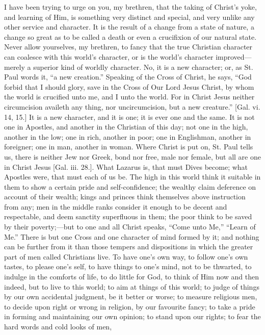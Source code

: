 I have been trying to urge on you, my brethren, that the taking of
Christ's yoke, and learning of Him, is something very distinct and
special, and very unlike any other service and character. It is the
result of a change from a state of nature, a change so great as to be
called a death or even a crucifixion of our natural state. Never allow
yourselves, my brethren, to fancy that the true Christian character
can coalesce with this world's character, or is the world's character
improved—merely a superior kind of worldly character. No, it is a
new character; or, as St. Paul words it, ``a new creation.''
Speaking of the Cross of Christ, he says, ``God forbid that I
should glory, save in the Cross of Our Lord Jesus Christ, by whom the
world is crucified unto me, and I unto the world. For in Christ Jesus
neither circumcision availeth any thing, nor uncircumcision, but a new
creature.'' [Gal. vi. 14, 15.] It is a new character, and it is
one; it is ever one and the same. It is not one in Apostles, and
another in the Christian of this day; not one in the high, another in
the low; one in rich, another in poor; one in Englishman, another in
foreigner; one in man, another in woman. Where Christ is put on, St.
Paul tells us, there is neither Jew nor Greek, bond nor free, male nor
female, but all are one in Christ Jesus [Gal. iii. 28.]. What Lazarus
is, that must Dives become; what Apostles were, that must each of us
be. The high in this world think it suitable in them to show a certain
pride and self-confidence; the wealthy claim deference on account of
their wealth; kings and princes think themselves above instruction
from any; men in the middle ranks consider it enough to be decent and
respectable, and deem sanctity superfluous in them; the poor think to
be saved by their poverty;—but to one and all Christ speaks,
``Come unto Me,'' ``Learn of Me.'' There is but one
Cross and one character of mind formed by it; and nothing can be
further from it than those tempers and dispositions in which the
greater part of men called Christians live. To have one's own way, to
follow one's own tastes, to please one's self, to have things to one's
mind, not to be thwarted, to indulge in the comforts of life, to do
little for God, to think of Him now and then indeed, but to live to
this world; to aim at things of this world; to judge of things by our
own accidental judgment, be it better or worse; to measure religious
men, to decide upon right or wrong in religion, by our favourite
fancy; to take a pride in forming and maintaining our own opinion; to
stand upon our rights; to fear the hard words and cold looks of men,
